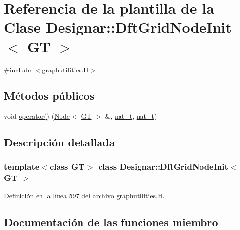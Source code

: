\hypertarget{class_designar_1_1_dft_grid_node_init}{}\section{Referencia de la plantilla de la Clase Designar\+:\+:Dft\+Grid\+Node\+Init$<$ GT $>$}
\label{class_designar_1_1_dft_grid_node_init}


{\ttfamily \#include $<$graphutilities.\+H$>$}

\subsection*{Métodos públicos}
\begin{DoxyCompactItemize}
\item 
void \hyperlink{class_designar_1_1_dft_grid_node_init_a9608556db92626f723c7acb35751041b}{operator()} (\hyperlink{namespace_designar_a5af326c65aa2bd26b26c410f2030d09e}{Node}$<$ \hyperlink{demo-buildgraph_8_c_a3001c40d2c31ca87ed96cd7d1334a55e}{GT} $>$ \&, \hyperlink{namespace_designar_aa72662848b9f4815e7bf31a7cf3e33d1}{nat\+\_\+t}, \hyperlink{namespace_designar_aa72662848b9f4815e7bf31a7cf3e33d1}{nat\+\_\+t})
\end{DoxyCompactItemize}


\subsection{Descripción detallada}
\subsubsection*{template$<$class GT$>$\newline
class Designar\+::\+Dft\+Grid\+Node\+Init$<$ G\+T $>$}



Definición en la línea 597 del archivo graphutilities.\+H.



\subsection{Documentación de las funciones miembro}
\mbox{\label{class_designar_1_1_dft_grid_node_init_a9608556db92626f723c7acb35751041b}} 
